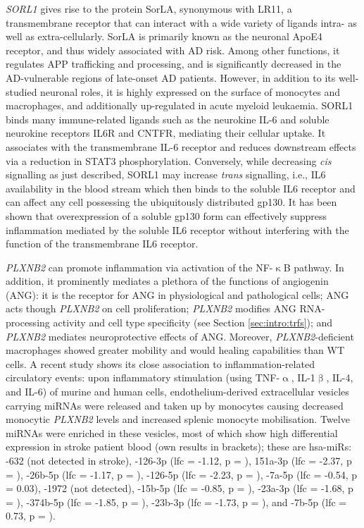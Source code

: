 \emph{SORL1} gives rise to the protein SorLA, synonymous with LR11, a transmembrane receptor that can interact with a wide variety of ligands intra- as well as extra-cellularly.\cite{Yin2015} SorLA is primarily known as the neuronal ApoE4 receptor, and thus widely associated with AD risk. Among other functions, it regulates APP trafficking and processing, and is significantly decreased in the AD-vulnerable regions of late-onset AD patients.\cite{Yin2015} However, in addition to its well-studied neuronal roles, it is highly expressed on the surface of monocytes and macrophages, and additionally up-regulated in acute myeloid leukaemia.\cite{Sakai2012} SORL1 binds many immune-related ligands such as the neurokine IL-6 and soluble neurokine receptors IL6R and CNTFR, mediating their cellular uptake. It associates with the transmembrane IL-6 receptor and reduces downstream effects via a reduction in STAT3 phosphorylation.\cite{Larsen2017} Conversely, while decreasing \emph{cis} signalling as just described, SORL1 may increase \emph{trans} signalling, i.e., IL6 availability in the blood stream which then binds to the soluble IL6 receptor and can affect any cell possessing the ubiquitously distributed gp130.\cite{Rabe2008} It has been shown that overexpression of a soluble gp130 form can effectively suppress inflammation mediated by the soluble IL6 receptor without interfering with the function of the transmembrane IL6 receptor.\cite{Rabe2008}

\emph{PLXNB2} can promote inflammation via activation of the NF-$\upkappa$B pathway.\cite{Zhang2018} In addition, it prominently mediates a plethora of the functions of angiogenin (ANG): it is the receptor for ANG in physiological and pathological cells; ANG acts though \emph{PLXNB2} on cell proliferation; \emph{PLXNB2} modifies ANG RNA-processing activity and cell type specificity (see Section \ref{sec:intro:trfs}); and \emph{PLXNB2} mediates neuroprotective effects of ANG.\cite{Yu2017} Moreover, \emph{PLXNB2}-deficient macrophages showed greater mobility and would healing capabilities than WT cells.\cite{Roney2011} A recent study shows its close association to inflammation-related circulatory events: upon inflammatory stimulation (using TNF-$\upalpha$, IL-1$\upbeta$, IL-4, and IL-6) of murine and human cells, endothelium-derived extracellular vesicles carrying miRNAs were released and taken up by monocytes causing decreased monocytic \emph{PLXNB2} levels and increased splenic monocyte mobilisation.\cite{Akbar2017} Twelve miRNAs were enriched in these vesicles, most of which show high differential expression in stroke patient blood (own results in brackets); these are hsa-miRs: -632 (not detected in stroke), -126-3p (\ac{lfc} = -1.12, p = ), 151a-3p (\ac{lfc} = -2.37, p = ), -26b-5p (\ac{lfc} = -1.17, p = ), -126-5p (\ac{lfc} = -2.23, p = ), -7a-5p (\ac{lfc} = -0.54, p = 0.03), -1972 (not detected), -15b-5p (\ac{lfc} = -0.85, p = ), -23a-3p (\ac{lfc} = -1.68, p = ), -374b-5p (\ac{lfc} = -1.85, p = ), -23b-3p (\ac{lfc} = -1.73, p = ), and -7b-5p (\ac{lfc} = 0.73, p = ).

